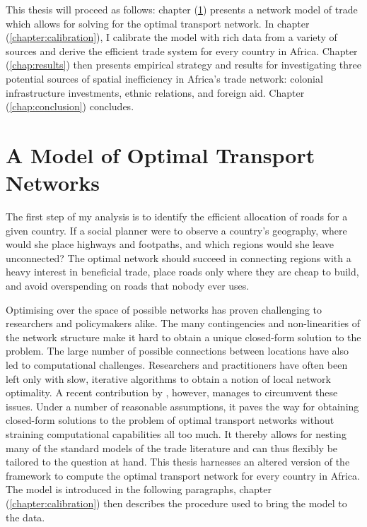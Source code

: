\documentclass[11pt, oneside]{article}   	%
\let\oldref\ref
\renewcommand{\ref}[1]{(\oldref{#1})}
\begin{document}
This thesis will proceed as follows: chapter \ref{chap:model} presents a network model of trade which allows for solving for the optimal transport network. In chapter \ref{chapter:calibration}, I calibrate the model with rich data from a variety of sources and derive the efficient trade system for every country in Africa. Chapter \ref{chap:results} then presents empirical strategy and results for investigating three potential sources of spatial inefficiency in Africa's trade network: colonial infrastructure investments, ethnic relations, and foreign aid. Chapter \ref{chap:conclusion} concludes.

\section{A Model of Optimal Transport Networks}
\label{chap:model}
The first step of my analysis is to identify the efficient allocation of roads for a given country. If a social planner were to observe a country's geography, where would she place highways and footpaths, and which regions would she leave unconnected? The optimal network should succeed in connecting regions with a heavy interest in beneficial trade, place roads only where they are cheap to build, and avoid overspending on roads that nobody ever uses.

Optimising over the space of possible networks has proven challenging to researchers and policymakers alike. The many contingencies and non-linearities of the network structure make it hard to obtain a unique closed-form solution to the problem. The large number of possible connections between locations have also led to computational challenges. Researchers and practitioners have often been left only with slow, iterative algorithms to obtain a notion of local network optimality. A recent contribution by \cite{fajgelbaum_optimal_2017}, however, manages to circumvent these issues. Under a number of reasonable assumptions, it paves the way for obtaining closed-form solutions to the problem of optimal transport networks without straining computational capabilities all too much. It thereby allows for nesting many of the standard models of the trade literature and can thus flexibly be tailored to the question at hand. This thesis harnesses an altered version of the \citeauthor{fajgelbaum_optimal_2017} framework to compute the optimal transport network for every country in Africa. The model is introduced in the following paragraphs, chapter \ref{chapter:calibration} then describes the procedure used to bring the model to the data.
\end{document}
